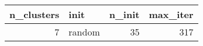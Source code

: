 \begin{tabular}{rlrr}
\toprule
n_clusters & init & n_init & max_iter \\
\midrule
7 & random & 35 & 317 \\
\bottomrule
\end{tabular}
